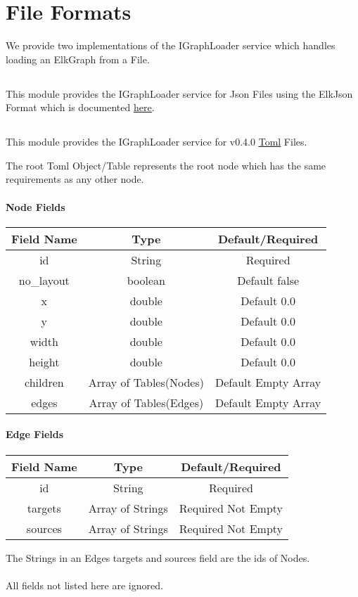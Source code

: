 \section{File Formats}

We provide two implementations of the IGraphLoader service
which handles loading an ElkGraph from a File.

\subsection{}

This module provides the IGraphLoader service for Json Files using the ElkJson Format which is documented \underline{\href{https://www.eclipse.org/elk/documentation/tooldevelopers/graphdatastructure/jsonformat.html}{here}}.

\subsection{}

This module provides the IGraphLoader service for v0.4.0 \underline{\href{https://github.com/toml-lang/toml}{Toml}} Files.

The root Toml Object/Table represents the root node which
has the same requirements as any other node.

\paragraph{Node Fields}
\begin{tabular}{|c|c|c|}
\hline 
Field Name & Type & Default/Required \\ 
\hline 
id & String & Required \\ 
\hline 
no\_layout & boolean & Default false \\ 
\hline 
x & double & Default 0.0 \\ 
\hline 
y & double & Default 0.0 \\ 
\hline 
width & double & Default 0.0 \\ 
\hline 
height & double & Default 0.0 \\ 
\hline 
children & Array of Tables(Nodes) & Default Empty Array \\ 
\hline 
edges & Array of Tables(Edges) & Default Empty Array \\ 
\hline 
\end{tabular} 

\paragraph{Edge Fields}
\begin{tabular}{|c|c|c|}
\hline 
Field Name & Type & Default/Required \\ 
\hline 
id & String & Required \\ 
\hline 
targets & Array of Strings & Required Not Empty \\ 
\hline 
sources & Array of Strings & Required Not Empty \\ 
\hline 
\end{tabular} 

The Strings in an Edges targets and sources field are the ids of Nodes.

\paragraph{}
All fields not listed here are ignored.